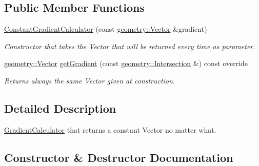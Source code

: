 \subsection*{Public Member Functions}
\begin{DoxyCompactItemize}
\item 
\hyperlink{classraytracer_1_1physics_1_1ConstantGradientCalculator_acf1c99366ffbe215a5150a8ab4c656f5}{Constant\+Gradient\+Calculator} (const \hyperlink{classraytracer_1_1geometry_1_1Vector}{geometry\+::\+Vector} \&gradient)
\begin{DoxyCompactList}\small\item\em Constructor that takes the Vector that will be returned every time as parameter. \end{DoxyCompactList}\item 
\hyperlink{classraytracer_1_1geometry_1_1Vector}{geometry\+::\+Vector} \hyperlink{classraytracer_1_1physics_1_1ConstantGradientCalculator_a62913e68275b1c46893db6fcc74a387f}{get\+Gradient} (const \hyperlink{structraytracer_1_1geometry_1_1Intersection}{geometry\+::\+Intersection} \&) const override
\begin{DoxyCompactList}\small\item\em Returns always the same Vector given at construction. \end{DoxyCompactList}\end{DoxyCompactItemize}


\subsection{Detailed Description}
\hyperlink{classraytracer_1_1physics_1_1GradientCalculator}{Gradient\+Calculator} that returns a constant Vector no matter what. 

\subsection{Constructor \& Destructor Documentation}
\mbox{\label{classraytracer_1_1physics_1_1ConstantGradientCalculator_acf1c99366ffbe215a5150a8ab4c656f5}} 
